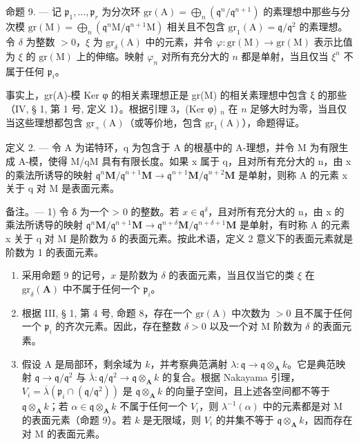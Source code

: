 命题 9. --- 记 \(\mathfrak{p}_1, \ldots, \mathfrak{p}_r\) 为分次环 \(\mathrm{gr}(\mathrm{A}) = \bigoplus_{n} (\mathfrak{q}^n / \mathfrak{q}^{n+1})\) 的素理想中那些与分次模 \(\mathrm{gr}(\mathrm{M}) = \bigoplus_{n} (\mathfrak{q}^n \mathrm{M} / \mathfrak{q}^{n+1} \mathrm{M})\) 相关且不包含 \(\mathrm{gr}_1(\mathrm{A}) = \mathfrak{q} / \mathfrak{q}^2\) 的素理想。令 \(\delta\) 为整数 \(>0\)，\(\xi\) 为 \(\mathrm{gr}_{\delta}(\mathrm{A})\) 中的元素，并令 \(\varphi : \mathrm{gr}(\mathrm{M}) \to \mathrm{gr}(\mathrm{M})\) 表示比值为 \(\xi\) 的 \(\mathrm{gr}(\mathrm{M})\) 上的伸缩。映射 \(\varphi_n\) 对所有充分大的 \(n\) 都是单射，当且仅当 \(\xi^n\) 不属于任何 \(\mathfrak{p}_i\)。

事实上，gr(A)-模 Ker φ 的相关素理想正是 gr(M) 的相关素理想中包含 ξ 的那些（IV, § 1, 第 1 号, 定义 1）。根据引理 3，(Ker φ) \(_n\) 在 \(n\) 足够大时为零，当且仅当这些理想都包含 \(\mathrm{gr}_{+}(\mathrm{A})\)（或等价地，包含 \(\mathrm{gr}_{1}(\mathrm{A})\)），命题得证。

定义 2. --- 令 A 为诺特环，q 为包含于 A 的根基中的 A-理想，并令 M 为有限生成 A-模，使得 M/qM 具有有限长度。如果 x 属于 q，且对所有充分大的 n，由 x 的乘法所诱导的映射 \(\mathfrak{q}^{n}\mathbf{M}/\mathfrak{q}^{n+1}\mathbf{M} \to \mathfrak{q}^{n+1}\mathbf{M}/\mathfrak{q}^{n+2}\mathbf{M}\) 是单射，则称 A 的元素 x 关于 q 对 M 是表面元素。

备注。--- 1) 令 δ 为一个 \textgreater{} 0 的整数。若 \(x \in \mathfrak{q}^{\delta}\)，且对所有充分大的 n，由 x 的乘法所诱导的映射 \(\mathfrak{q}^{n}\mathbf{M}/\mathfrak{q}^{n+1}\mathbf{M} \to \mathfrak{q}^{n+\delta}\mathbf{M}/\mathfrak{q}^{n+\delta+1}\mathbf{M}\) 是单射，有时称 A 的元素 x 关于 q 对 M 是阶数为 δ 的表面元素。按此术语，定义 2 意义下的表面元素就是阶数为 1 的表面元素。

\begin{enumerate}
\def\labelenumi{\arabic{enumi})}
\setcounter{enumi}{1}
\item
   采用命题 9 的记号，\(x\) 是阶数为 \(\delta\) 的表面元素，当且仅当它的类 \(\xi\) 在 \(\mathrm{gr}_{\delta}(\mathbf{A})\) 中不属于任何一个 \(\mathfrak{p}_i\)。
\item
  根据 III, § 1, 第 4 号, 命题 8，存在一个 \(\mathrm{gr}(\mathrm{A})\) 中次数为 \(>0\) 且不属于任何一个 \(\mathfrak{p}_i\) 的齐次元素。因此，存在整数 \(\delta > 0\) 以及一个对 M 阶数为 \(\delta\) 的表面元素。
\item
   假设 A 是局部环，剩余域为 \(k\)，并考察典范满射 \(\lambda: \mathfrak{q} \to \mathfrak{q} \otimes_{\mathbf{A}} k\)。它是典范映射 \(\mathfrak{q} \to \mathfrak{q}/\mathfrak{q}^2\) 与 \(\overline{\lambda}: \mathfrak{q}/\mathfrak{q}^2 \to \mathfrak{q} \otimes_{\mathbf{A}} k\) 的复合。根据 Nakayama 引理，\(V_i = \overline{\lambda}(\mathfrak{p}_i \cap (\mathfrak{q}/\mathfrak{q}^2))\) 是 \(\mathfrak{q} \otimes_{\mathbf{A}} k\) 的向量子空间，且上述各空间都不等于 \(\mathfrak{q} \otimes_{\mathbf{A}} k\)；若 \(\alpha \in \mathfrak{q} \otimes_{\mathbf{A}} k\) 不属于任何一个 \(V_i\)，则 \(\lambda^{-1}(\alpha)\) 中的元素都是对 M 的表面元素（命题 9）。若 \(k\) 是无限域，则 \(V_i\) 的并集不等于 \(\mathfrak{q} \otimes_{\mathbf{A}} k\)，因而存在对 M 的表面元素。
\end{enumerate}


